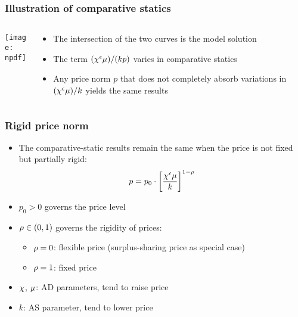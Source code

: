 \documentclass[11pt,aspectratio=169,xcolor={dvipsnames},hyperref={pdftex,pdfpagemode=UseNone,hidelinks,pdfdisplaydoctitle=true},usepdftitle=false]{beamer}
\newcommand{\npdf}{../figures/figures2.pdf}
\begin{document}
\begin{frame}
\frametitle{Illustration of comparative statics}
\begin{columns}
\begin{column}{0.6\textwidth}
\texttt{[image: \\npdf]}%
\end{column}
\begin{column}{0.4\textwidth}
\begin{itemize}
	\item The intersection of the two curves is the model solution
	\item The term $(\chi^{\epsilon} \mu)/(kp)$ varies in comparative statics
	\item Any price norm $p$ that does not completely absorb variations in $(\chi^{\epsilon} \mu)/k$ yields the same results
\end{itemize}
\end{column}
\end{columns} 
\end{frame}

\begin{frame}
\frametitle{Rigid price norm}
\begin{itemize}
\item The comparative-static results remain the same when the price is not fixed but partially rigid:
\begin{equation*}
p = p_0 \cdot \left[ \frac{\chi^{\epsilon} \mu}{k} \right]^{1-\rho}
\end{equation*}
\item $p_0 >0$ governs the price level
\item $\rho\in(0,1)$ governs the rigidity of prices:
\begin{itemize}
 	\item $\rho=0$: flexible price (surplus-sharing price as special case)
 	\item $\rho=1$: fixed price
 \end{itemize} 
 \item $\chi$, $\mu$: AD parameters, tend to raise price
 \item $k$: AS parameter, tend to lower price
\end{itemize}	
\end{frame}
\end{document}
